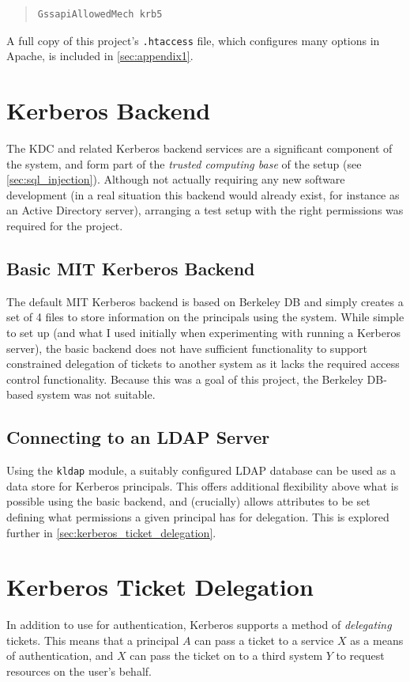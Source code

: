 \documentclass[12pt]{report}
\begin{document}
\begin{quote}
\begin{verbatim}
GssapiAllowedMech krb5
\end{verbatim}
\end{quote}

A full copy of this project's \verb+.htaccess+ file, which configures many options in Apache, is included in \autoref{sec:appendix1}.

\section{Kerberos Backend}
\label{sec:kerberos_backend}
The KDC and related Kerberos backend services are a significant component of the system, and form part of the \textit{trusted computing base} of the setup (see \autoref{sec:sql_injection}). Although not actually requiring any new software development (in a real situation this backend would already exist, for instance as an Active Directory server), arranging a test setup with the right permissions was required for the project.

\subsection{Basic MIT Kerberos Backend}
The default MIT Kerberos backend is based on Berkeley DB and simply creates a set of 4 files to store information on the principals using the system\cite{KDC-database-docs}. While simple to set up (and what I used initially when experimenting with running a Kerberos server), the basic backend does not have sufficient functionality to support constrained delegation of tickets to another system as it lacks the required access control functionality\cite{KRB-DELEG}. Because this was a goal of this project, the Berkeley DB-based system was not suitable.

\subsection{Connecting to an LDAP Server}
Using the \texttt{kldap} module, a suitably configured LDAP database can be used as a data store for Kerberos principals. This offers additional flexibility above what is possible using the basic backend, and (crucially) allows attributes to be set defining what permissions a given principal has for delegation. This is explored further in \autoref{sec:kerberos_ticket_delegation}.

\section{Kerberos Ticket Delegation}
\label{sec:kerberos_ticket_delegation}
In addition to use for authentication, Kerberos supports a method of \textit{delegating} tickets. This means that a principal $A$ can pass a ticket to a service $X$ as a means of authentication, and $X$ can pass the ticket on to a third system $Y$ to request resources on the user's behalf.
\end{document}
